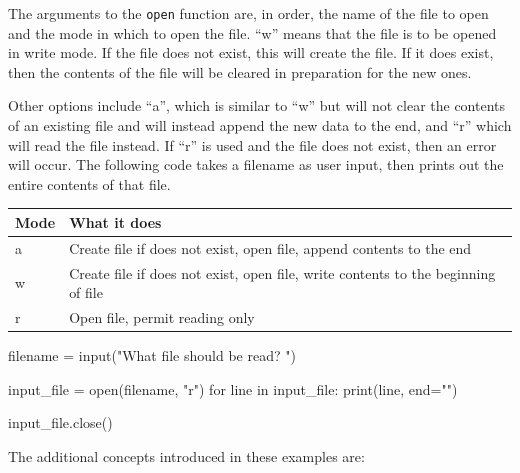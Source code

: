 \documentclass[11pt]{cselabheader}
\begin{document}
The arguments to the \lstinline{open} function are, in order, the name of the
file to open and the mode in which to open the file. ``w'' means that the file
is to be opened in write mode. If the file does not exist, this will create the
file. If it does exist, then the contents of the file will be cleared in
preparation for the new ones.

Other options include ``a'', which is similar to ``w'' but will not clear the
contents of an existing file and will instead append the new data to the end,
and ``r'' which will read the file instead. If ``r'' is used and the file does
not exist, then an error will occur. The following code takes a filename as user
input, then prints out the entire contents of that file.

\begin{table}[!ht]
  \centering
  \begin{tabular}{ll}
    Mode & What it does \\
    \midrule
    a & Create file if does not exist, open file, append contents to the end \\
    w & Create file if does not exist, open file, write contents to the beginning
    of file \\
    r & Open file, permit reading only \\
  \end{tabular}
\end{table}

\begin{python3code}
filename = input("What file should be read? ")

input_file = open(filename, "r")
for line in input_file:
  print(line, end="")

input_file.close()
\end{python3code}

The additional concepts introduced in these examples are:
\end{document}
